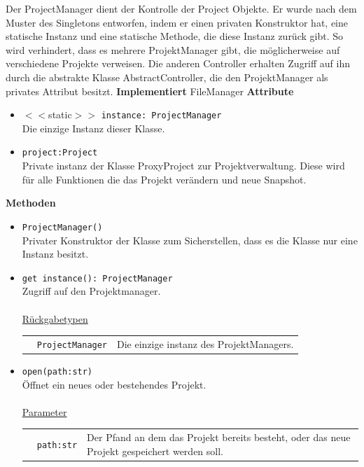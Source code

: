 \documentclass{article}
\begin{document}
\begin{itemize}
Der ProjectManager dient der Kontrolle der Project Objekte. Er wurde nach dem Muster des Singletons entworfen, indem er einen privaten Konstruktor hat, eine statische Instanz und eine statische Methode, die diese Instanz zurück gibt. So wird verhindert, dass es mehrere ProjektManager gibt, die möglicherweise auf verschiedene Projekte verweisen. Die anderen Controller erhalten Zugriff auf ihn durch die abstrakte Klasse AbstractController, die den ProjektManager als privates Attribut besitzt.
\newline\newline
\textbf{\large{Implementiert}} FileManager 
\newline\newline
\textbf{\large{Attribute}}
\begin{itemize}
\item $ < $$ < $static$ > $$ > $ \texttt{instance: ProjectManager}\\ Die einzige Instanz dieser Klasse.
\item \texttt{project:Project}\\Private instanz der Klasse ProxyProject zur Projektverwaltung. Diese wird für alle Funktionen die das Projekt verändern und neue Snapshot. 
\end{itemize}\leavevmode\newline
\textbf{\large{Methoden}}
\begin{itemize}
\item \texttt{ProjectManager()}\\ Privater Konstruktor der Klasse zum Sicherstellen, dass es die Klasse nur eine Instanz besitzt.
\item \texttt{get instance(): ProjectManager}\\ Zugriff auf den Projektmanager.\\\\
\underline{{Rückgabetypen}}\\
\begin{tabular}{llp{8.5cm}}
 & \texttt{ProjectManager} & Die einzige instanz des ProjektManagers. \\
\end{tabular}
\item \texttt{open(path:str)}\\ Öffnet ein neues oder bestehendes Projekt.\\\\
\underline{{Parameter}}\\
\begin{tabular}{llp{8.5cm}}
 & \texttt{path:str} & Der Pfand an dem das Projekt bereits besteht, oder das neue Projekt gespeichert werden soll. \\
\end{tabular}


\end{itemize}
\end{itemize}
\end{document}
